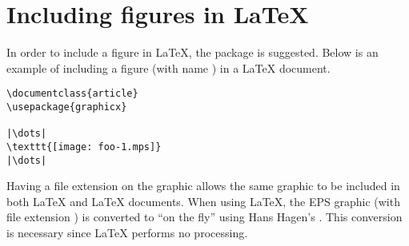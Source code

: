\section{Including \MP{} figures in \LaTeX}
\label{sec:latexincl}

In order to include a \MP{} figure in \LaTeX{}, the 
package is suggested.  Below is an example of including a \MP{} figure
(with name ) in a \LaTeX{} document.

\begin{lstlisting}[style=LaTeX]
\documentclass{article}
\usepackage{graphicx}

|\dots|
\texttt{[image: foo-1.mps]}
|\dots|

\end{lstlisting}

Having a  file extension on the graphic allows the same
graphic to be included in both \LaTeX{} and \PDF\LaTeX{} documents.
When using \PDF\LaTeX, the EPS graphic (with file extension )
is converted to \PDF{} ``on the fly'' using Hans Hagen's .
This conversion is necessary since \PDF\LaTeX{} performs no \PS{}
processing.
